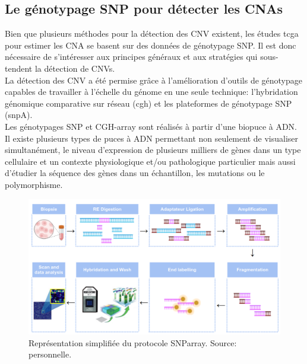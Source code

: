 \documentclass{style}
\begin{document}
\subsection{Le génotypage SNP pour détecter les CNAs}
Bien que plusieurs méthodes pour la détection des CNV existent, les études \acrshort{tcga} pour estimer les CNA se basent sur des données de génotypage SNP. Il est donc nécessaire de s’intéresser aux principes généraux et aux stratégies qui sous-tendent la détection de CNVs. \\
La détection des CNV a été permise grâce à l’amélioration d’outils de génotypage capables de travailler à l'échelle du génome en une seule technique: l'hybridation génomique comparative sur réseau (\acrshort{cgh}) et les plateformes de génotypage SNP (\acrshort{snpA}). \\
Les génotypages SNP et CGH-array sont réalisés à partir d’une biopuce à ADN. Il existe plusieurs types de puces à ADN permettant non seulement de visualiser simultanément, le niveau d’expression de plusieurs milliers de gènes dans un type cellulaire et un contexte physiologique et/ou pathologique particulier mais aussi d’étudier la séquence des gènes dans un échantillon, les mutations ou le polymorphisme.
\begin{figure}[H]
  \centering
  \includegraphics[width=15cm]{images/figures/genotyping.png}
  \caption[Représentation simplifiée du protocole SNParray.]{Représentation simplifiée du protocole SNParray. Source: personnelle.}
  \label{SNParray}
\end{figure}
\end{document}
